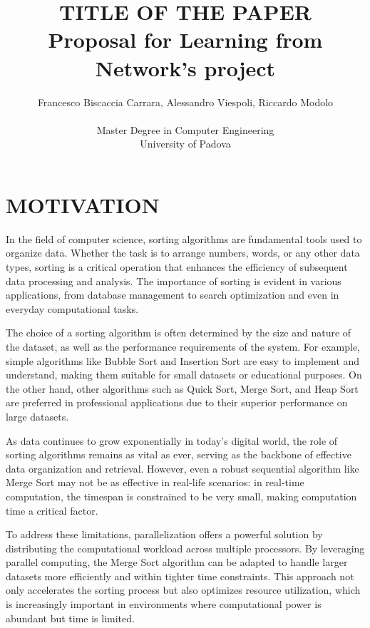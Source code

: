 \documentclass[article,12pt,conference]{ieeeconf} %
\title{\LARGE TITLE OF THE PAPER \\
\large Proposal for Learning from Network's project \\}
\author{Francesco Biscaccia Carrara, Alessandro Viespoli, Riccardo Modolo %
\\\\ Master Degree in Computer Engineering \\
University of Padova \\
}
\begin{document}
\maketitle
\thispagestyle{plain}
\pagestyle{plain}

\section{MOTIVATION}

In the field of computer science, sorting algorithms are fundamental tools used to organize data. Whether the task is to arrange numbers, words, or any other data types, sorting is a critical operation that enhances the efficiency of subsequent data processing and analysis. The importance of sorting is evident in various applications, from database management to search optimization and even in everyday computational tasks.\par

The choice of a sorting algorithm is often determined by the size and nature of the dataset, as well as the performance requirements of the system. For example, simple algorithms like Bubble Sort and Insertion Sort are easy to implement and understand, making them suitable for small datasets or educational purposes. On the other hand, other algorithms such as Quick Sort, Merge Sort, and Heap Sort are preferred in professional applications due to their superior performance on large datasets.\par

As data continues to grow exponentially in today's digital world, the role of sorting algorithms remains as vital as ever, serving as the backbone of effective data organization and retrieval. However, even a robust sequential algorithm like Merge Sort may not be as effective in real-life scenarios: in real-time computation, the timespan is constrained to be very small, making computation time a critical factor.\par

To address these limitations, parallelization offers a powerful solution by distributing the computational workload across multiple processors. By leveraging parallel computing, the Merge Sort algorithm can be adapted to handle larger datasets more efficiently and within tighter time constraints. This approach not only accelerates the sorting process but also optimizes resource utilization, which is increasingly important in environments where computational power is abundant but time is limited.\par
\end{document}
